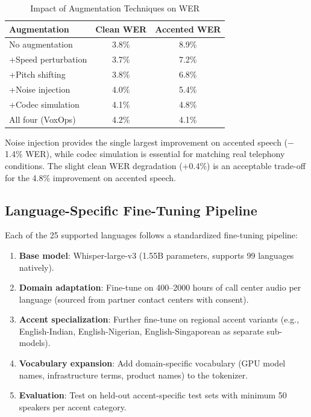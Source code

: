 \documentclass[conference,10pt]{IEEEtran}
\begin{document}
\begin{table}[!htbp]
\caption{Impact of Augmentation Techniques on WER}
\label{tab:augment}
\centering\scriptsize
\begin{tabular}{@{}lcc@{}}
\toprule
\textbf{Augmentation} & \textbf{Clean WER} & \textbf{Accented WER} \\
\midrule
No augmentation & 3.8\% & 8.9\% \\
+Speed perturbation & 3.7\% & 7.2\% \\
+Pitch shifting & 3.8\% & 6.8\% \\
+Noise injection & 4.0\% & 5.4\% \\
+Codec simulation & 4.1\% & 4.8\% \\
All four (VoxOps) & 4.2\% & 4.1\% \\
\bottomrule
\end{tabular}
\end{table}

Noise injection provides the single largest improvement on accented speech ($-$1.4\% WER), while codec simulation is essential for matching real telephony conditions. The slight clean WER degradation (+0.4\%) is an acceptable trade-off for the 4.8\% improvement on accented speech.

\subsection{Language-Specific Fine-Tuning Pipeline}

Each of the 25 supported languages follows a standardized fine-tuning pipeline:

\begin{enumerate}
\item \textbf{Base model}: Whisper-large-v3 (1.55B parameters, supports 99 languages natively).
\item \textbf{Domain adaptation}: Fine-tune on 400--2000 hours of call center audio per language (sourced from partner contact centers with consent).
\item \textbf{Accent specialization}: Further fine-tune on regional accent variants (e.g., English-Indian, English-Nigerian, English-Singaporean as separate sub-models).
\item \textbf{Vocabulary expansion}: Add domain-specific vocabulary (GPU model names, infrastructure terms, product names) to the tokenizer.
\item \textbf{Evaluation}: Test on held-out accent-specific test sets with minimum 50 speakers per accent category.
\end{enumerate}
\end{document}
